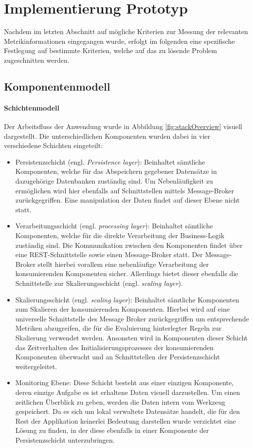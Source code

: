 \section{Implementierung Prototyp}

Nachdem im letzten Abschnitt auf mögliche Kriterien zur Messung der relevanten Metrikinformationen eingegangen wurde, erfolgt im folgenden eine spezifische Festlegung auf bestimmte Kriterien, welche auf das zu lösende Problem zugeschnitten werden.

\subsection{Komponentenmodell}

\paragraph{Schichtenmodell}
Der Arbeitsfluss der Anwendung wurde in Abbildung \ref{fig:stackOverview} visuell dargestellt. Die unterschiedlichen Komponenten wurden dabei in vier verschiedene Schichten eingeteilt: 

\begin{itemize}
  \item Persistenzschicht (engl. \emph{Persistence layer}): Beinhaltet sämtliche Komponenten, welche für das Abspeichern gegebener Datensätze in dazugehörige Datenbanken zuständig sind. Um Nebenläufigkeit zu ermöglichen wird hier ebenfalls auf Schnittstellen mittels Message-Broker zurückgegriffen. Eine manipulation der Daten findet auf dieser Ebene nicht statt.
  \item Verarbeitungsschicht (engl. \emph{processing layer}): Beinhaltet sämtliche Komponenten, welche für die direkte Verarbeitung der Business-Logik zuständig sind. Die Kommunikation zwischen den Komponenten findet über eine REST-Schnittstelle sowie einen Message-Broker statt. Der Message-Broker stellt hierbei vorallem eine nebenläufige Verarbeitung der konsumierenden Komponenten sicher. Allerdings bietet dieser ebenfalls die Schnittstelle zur Skalierungsschicht (engl. \emph{scaling layer}).
  \item Skalierungsschicht (engl. \emph{scaling layer}): Beinhaltet sämtliche Komponenten zum Skalieren der konsumierenden Komponenten. Hierbei wird auf eine universelle Schnittstelle des Message Broker zurückgegriffen um entsprechende Metriken abzugreifen, die für die Evaluierung hinterlegter Regeln zur Skalierung verwendet werden. Ansonsten wird in Komponenten dieser Schicht das Zeitverhalten des Initialisierungsprozesses der konsumierenden Komponenten überwacht und an Schnittstellen der Persistenzschicht weitergeleitet.
  \item Monitoring Ebene: Diese Schicht besteht aus einer einzigen Komponente, deren einzige Aufgabe es ist erhaltene Daten visuell darzustellen. Um einen zeitlichen Überblick zu geben, werden die Daten intern vom Werkzeug gespeichert. Da es sich um lokal verwaltete Datensätze handelt, die für den Rest der Applikation keinerlei Bedeutung darstellen wurde verzichtet eine Lösung zu finden, in der diese ebenfalls in einer Komponente der Persistenzschicht unterzubringen.
\end{itemize}


